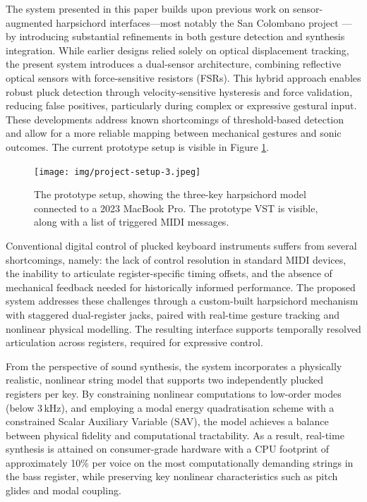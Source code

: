 The system presented in this paper builds upon previous work on sensor-augmented harpsichord interfaces—most notably the San Colombano project \cite{hamilton2025augmentation}—by introducing substantial refinements in both gesture detection and synthesis integration. While earlier designs relied solely on optical displacement tracking, the present system introduces a dual-sensor architecture, combining reflective optical sensors with force-sensitive resistors (FSRs). This hybrid approach enables robust pluck detection through velocity-sensitive hysteresis and force validation, reducing false positives, particularly during complex or expressive gestural input. These developments address known shortcomings of threshold-based detection and allow for a more reliable mapping between mechanical gestures and sonic outcomes. The current prototype setup is visible in Figure \ref{fig:setup}. 



\begin{figure}
    \centering
    \texttt{[image: img/project-setup-3.jpeg]}
    \caption{The prototype setup, showing the three-key harpsichord model connected to a 2023 MacBook Pro. The prototype VST is visible, along with a list of triggered MIDI messages.}
    \label{fig:setup}
\end{figure}



Conventional digital control of plucked keyboard instruments suffers from several shortcomings, namely: the lack of control resolution in standard MIDI devices, the inability to articulate register-specific timing offsets, and the absence of mechanical feedback needed for historically informed performance. The proposed system addresses these challenges through a custom-built harpsichord mechanism with staggered dual-register jacks, paired with real-time gesture tracking and nonlinear physical modelling. The resulting interface supports temporally resolved articulation across registers, required for expressive control.

From the perspective of sound synthesis, the system incorporates a physically realistic, nonlinear string model that supports two independently plucked registers per key. By constraining nonlinear computations to low-order modes (below 3\,kHz), and employing a modal energy quadratisation scheme with a constrained Scalar Auxiliary Variable (SAV), the model achieves a balance between physical fidelity and computational tractability. As a result, real-time synthesis is attained on consumer-grade hardware with a CPU footprint of approximately 10\% per voice on the most computationally demanding strings in the bass register, while preserving key nonlinear characteristics such as pitch glides and modal coupling.

